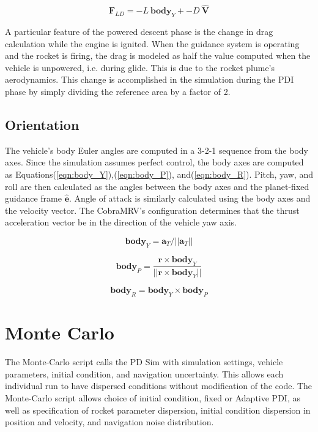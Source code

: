 \begin{equation}
\label{eqn:FLD}
\bm{F}_{LD} = -L\:\bm{body}_Y + -D\:\bm{\hat{V}}
\end{equation}

A particular feature of the powered descent phase is the change in drag calculation while the engine is ignited. When the guidance system is operating and the rocket is firing, the drag is modeled as half the value computed when the vehicle is unpowered, i.e. during glide. This is due to the rocket plume's aerodynamics. This change is accomplished in the simulation during the PDI phase by simply dividing the reference area by a factor of 2. 

\subsection{Orientation}\label{sec:orientation}
The vehicle's body Euler angles are computed in a 3-2-1 sequence from the body axes. Since the simulation assumes perfect control, the body axes are computed as Equations\:(\ref{eqn:body_Y}),\:(\ref{eqn:body_P}), and\:(\ref{eqn:body_R}). Pitch, yaw, and roll are then calculated as the angles between the body axes and the planet-fixed guidance frame $\hat{\bm{e}}$. Angle of attack is similarly calculated using the body axes and the velocity vector. The CobraMRV's configuration determines that the thrust acceleration vector be in the direction of the vehicle yaw axis.

\begin{equation}
\label{eqn:body_Y}
\bm{body}_Y = \bm{a}_T/||\bm{a}_T||
\end{equation}

\begin{equation}
\label{eqn:body_P}
\bm{body}_P = \frac{\bm{r} \times \bm{body}_Y}{||\bm{r} \times \bm{body}_Y||}
\end{equation}

\begin{equation}
\label{eqn:body_R}
\bm{body}_R = \bm{body}_Y \times \bm{body}_P
\end{equation}

\section{Monte Carlo}
The Monte-Carlo script calls the PD Sim with simulation settings, vehicle parameters, initial condition, and navigation uncertainty. This allows each individual run to have dispersed conditions without modification of the code. The Monte-Carlo script allows choice of initial condition, fixed or Adaptive PDI, as well as specification of rocket parameter dispersion, initial condition dispersion in position and velocity, and navigation noise distribution.

